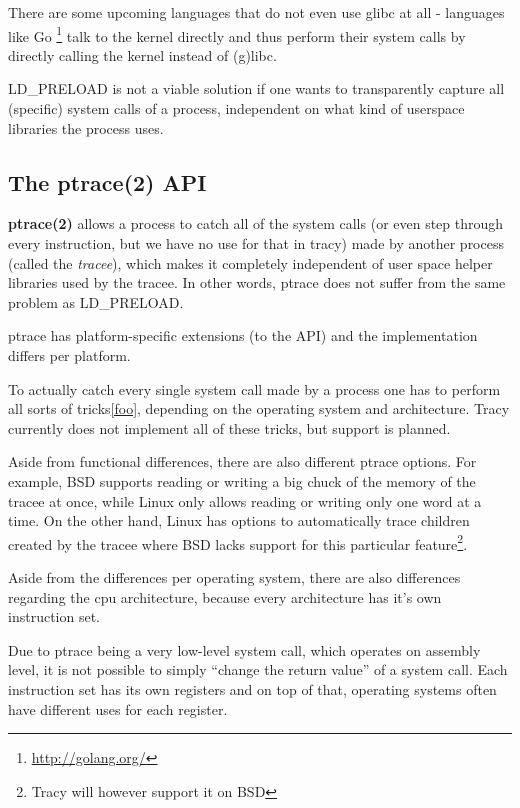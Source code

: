 \documentclass[a4paper, twoside, 10pt, twocolumn]{report}
\begin{document}
There are some upcoming languages that do not even use glibc at all - languages
like Go \footnote{\url{http://golang.org/}} talk to the kernel directly and
thus perform their system calls by directly calling the kernel instead of
(g)libc.

LD\_PRELOAD is not a viable solution if one wants to transparently capture all
(specific) system calls of a process, independent on what kind of userspace
libraries the process uses.

\subsection{The ptrace(2) API}

\textbf{ptrace(2)} allows a process to catch all of the system calls (or even
step through every instruction, but we have no use for that in tracy)
made by another process (called the \textit{tracee}), which makes it
completely independent of user space helper libraries used by the tracee.
In other words, ptrace does not suffer from the same problem as LD\_PRELOAD.

ptrace has platform-specific extensions (to the API) and the
implementation differs per platform. %

To actually catch every single system call made by a process one has to
perform all sorts of tricks\ref{foo}, depending on the operating system and
architecture. Tracy currently does not implement all of these tricks, but
support is planned.

Aside from functional differences, there are also different ptrace options.
For example, BSD supports reading or writing a big chuck of the memory
of the tracee at once, while Linux only allows reading or writing only one
word at a time. On the other hand, Linux has options to automatically trace
children created by the tracee where BSD lacks support for
this particular feature\footnote{Tracy will however support it on BSD}.

Aside from the differences per operating system, there are also differences
regarding the cpu architecture, because every architecture has it's own
instruction set.

Due to ptrace being a very low-level system call, which operates on assembly
level, it is not possible to simply ``change the return value'' of a system
call. Each instruction set has its own registers and on top of that, operating
systems often have different uses for each register.
\end{document}
